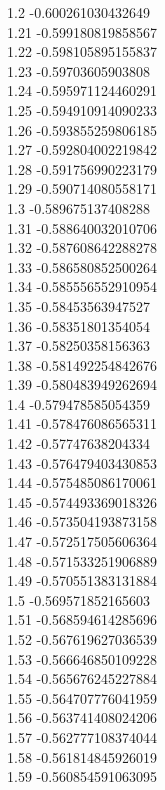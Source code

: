 {1.2	-0.600261030432649\\
1.21	-0.599180819858567\\
1.22	-0.598105895155837\\
1.23	-0.59703605903808\\
1.24	-0.595971124460291\\
1.25	-0.594910914090233\\
1.26	-0.593855259806185\\
1.27	-0.592804002219842\\
1.28	-0.591756990223179\\
1.29	-0.590714080558171\\
1.3	-0.589675137408288\\
1.31	-0.588640032010706\\
1.32	-0.587608642288278\\
1.33	-0.586580852500264\\
1.34	-0.585556552910954\\
1.35	-0.58453563947527\\
1.36	-0.58351801354054\\
1.37	-0.58250358156363\\
1.38	-0.581492254842676\\
1.39	-0.580483949262694\\
1.4	-0.579478585054359\\
1.41	-0.578476086565311\\
1.42	-0.57747638204334\\
1.43	-0.576479403430853\\
1.44	-0.575485086170061\\
1.45	-0.574493369018326\\
1.46	-0.573504193873158\\
1.47	-0.572517505606364\\
1.48	-0.571533251906889\\
1.49	-0.570551383131884\\
1.5	-0.569571852165603\\
1.51	-0.568594614285696\\
1.52	-0.567619627036539\\
1.53	-0.566646850109228\\
1.54	-0.565676245227884\\
1.55	-0.564707776041959\\
1.56	-0.563741408024206\\
1.57	-0.562777108374044\\
1.58	-0.561814845926019\\
1.59	-0.560854591063095\\
}
